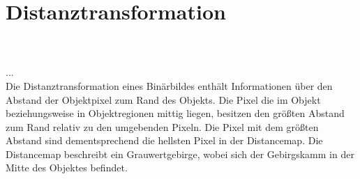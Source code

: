 \section{Distanztransformation}
\\\\
...\\
Die Distanztransformation eines Binärbildes enthält Informationen über den Abstand der Objektpixel zum Rand des Objekts. Die
Pixel die im Objekt beziehungsweise in Objektregionen mittig liegen, besitzen den größten Abstand zum Rand relativ zu den 
umgebenden Pixeln. Die Pixel mit dem größten Abstand sind dementsprechend die hellsten Pixel in der Distancemap. 
Die Distancemap beschreibt ein Grauwertgebirge, wobei sich der Gebirgskamm in der Mitte des Objektes befindet.
\label{sec:distanztransformation}
